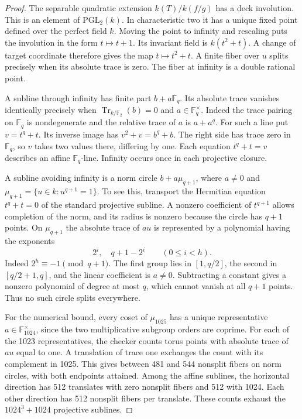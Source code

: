 \documentclass[11pt]{article}
\begin{document}
\begin{proof}
The separable quadratic extension \(k(T)/k(f/g)\) has a deck involution.
This is an element of \(\mathrm{PGL}_2(k)\). In characteristic two
it has a unique fixed point defined over the perfect field \(k\).
Moving the point to infinity and rescaling puts the involution
in the form \(t\mapsto t+1\). Its invariant field is \(k(t^2+t)\).
A change of target coordinate therefore gives the map \(t\mapsto t^2+t\).
A finite fiber over \(u\) splits precisely when its absolute trace is
zero. The fiber at infinity is a double rational point.

A subline through infinity has finite part \(b+a\mathbb F_q\).
Its absolute trace vanishes identically precisely when
\(\operatorname{Tr}_{k/\mathbb F_2}(b)=0\) and
\(a\in\mathbb F_q^\times\). Indeed the trace pairing on
\(\mathbb F_q\) is nondegenerate and the relative trace of \(a\)
is \(a+a^q\). For such a line put \(v=t^q+t\). Its inverse image
has \(v^2+v=b^q+b\). The right side has trace zero in \(\mathbb F_q\),
so \(v\) takes two values there, differing by one. Each equation
\(t^q+t=v\) describes an affine \(\mathbb F_q\)-line.
Infinity occurs once in each projective closure.

A subline avoiding infinity is a norm circle
\(b+a\mu_{q+1}\), where \(a\ne0\) and
\(\mu_{q+1}=\{u\in k:u^{q+1}=1\}\).
To see this, transport the Hermitian equation \(t^q+t=0\) of the
standard projective subline. A nonzero coefficient of \(t^{q+1}\)
allows completion of the norm, and its radius is nonzero because
the circle has \(q+1\) points. On \(\mu_{q+1}\) the absolute trace of
\(au\) is represented by a polynomial having the exponents
\[
 2^i,\quad q+1-2^i\qquad(0\le i<h).
\]
Indeed \(2^h\equiv-1\pmod{q+1}\). The first group lies in
\([1,q/2]\), the second in \([q/2+1,q]\), and the linear
coefficient is \(a\ne0\). Subtracting a constant gives a nonzero
polynomial of degree at most \(q\), which cannot vanish at all
\(q+1\) points. Thus no such circle splits everywhere.

For the numerical bound, every coset of \(\mu_{1025}\) has a unique
representative \(a\in\mathbb F_{1024}^\times\), since the two
multiplicative subgroup orders are coprime. For each of the 1023
representatives, the checker counts torus points with absolute trace
of \(au\) equal to one. A translation of trace one exchanges the
count with its complement in 1025. This gives between 481 and 544
nonsplit fibers on norm circles, with both endpoints attained.
Among the affine sublines, the horizontal direction has 512
translates with zero nonsplit fibers and 512 with 1024. Each other
direction has 512 nonsplit fibers per translate. These counts exhaust
the \(1024^3+1024\) projective sublines.
\end{proof}
\end{document}
